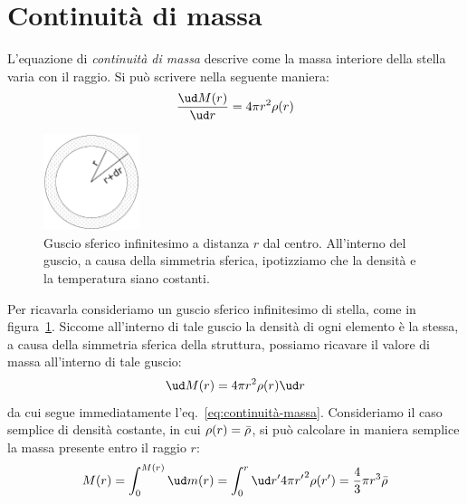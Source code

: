\section{Continuità di massa}\label{sec:continuità-massa}
L'equazione di \emph{continuità di massa} descrive come la massa interiore della stella varia con il raggio. Si può scrivere nella seguente maniera:
\begin{equation}\label{eq:continuità-massa}
    \dfrac{\ud M(r)}{\ud r} = 4 \pi r^2 \rho(r)
\end{equation}

\begin{figure}
\centering
\includegraphics[width=0.25\textwidth]{immagini/continuita-massa.png}
\caption{Guscio sferico infinitesimo a distanza $r$ dal centro. All'interno del guscio, a causa della simmetria sferica, ipotizziamo che la densità e la temperatura siano costanti.}
\label{fig:continuità-massa}
\end{figure}

Per ricavarla consideriamo un guscio sferico infinitesimo di stella, come in figura~\ref{fig:continuità-massa}. Siccome all'interno di tale guscio la densità di ogni elemento è la stessa, a causa della simmetria sferica della struttura, possiamo ricavare il valore di massa all'interno di tale guscio:
\[
    \ud M(r) = 4 \pi r^2 \rho(r) \ud r
\]
da cui segue immediatamente l'eq.~\eqref{eq:continuità-massa}. Consideriamo il caso semplice di densità costante, in cui $\rho(r) = \Bar{\rho}$, si può calcolare in  maniera semplice la massa presente entro il raggio $r$:
\[
    M(r) = \int_0^{M(r)} \ud m(r) = \int_0^r \ud r' 4 \pi {r'}^2 \rho(r') = \frac{4}{3} \pi r^3 \Bar{\rho}
\]
